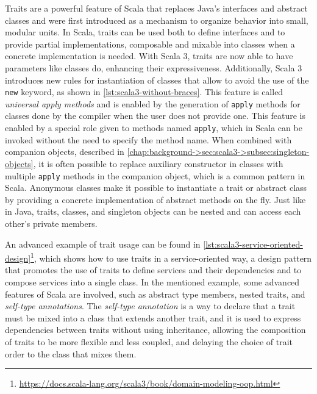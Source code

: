 Traits are a powerful feature of Scala that replaces Java's interfaces and abstract classes and were first introduced as a mechanism to organize behavior into small, modular units\cite{traits}.
%
In Scala, traits can be used both to define interfaces and to provide partial implementations, composable and mixable into classes when a concrete implementation is needed.
%
With Scala 3, traits are now able to have parameters like classes do, enhancing their expressiveness.
%
Additionally, Scala 3 introduces new rules for instantiation of classes that allow to avoid the use of the \texttt{new} keyword, as shown in \cref{lst:scala3-without-braces}.
%
This feature is called \textit{universal apply methods} and is enabled by the generation of \texttt{apply} methods for classes done by the compiler when the user does not provide one.
%
This feature is enabled by a special role given to methods named \texttt{apply}, which in Scala can be invoked without the need to specify the method name.
%
When combined with companion objects, described in \cref{chap:background->sec:scala3->subsec:singleton-objects}, it is often possible to replace auxiliary constructor in classes with multiple \texttt{apply} methods in the companion object, which is a common pattern in Scala.
%
Anonymous classes make it possible to instantiate a trait or abstract class by providing a concrete implementation of abstract methods on the fly.
%
Just like in Java, traits, classes, and singleton objects can be nested and can access each other's private members.

An advanced example of trait usage can be found in \cref{lst:scala3-service-oriented-design}\footnote{\url{https://docs.scala-lang.org/scala3/book/domain-modeling-oop.html}}, which shows how to use traits in a service-oriented way, a design pattern that promotes the use of traits to define services and their dependencies and to compose services into a single class\cite{service-oriented-design}.
%
In the mentioned example, some advanced features of Scala are involved, such as abstract type members, nested traits, and \textit{self-type annotations}.
%
The \textit{self-type annotation} is a way to declare that a trait must be mixed into a class that extends another trait, and it is used to express dependencies between traits without using inheritance, allowing the composition of traits to be more flexible and less coupled, and delaying the choice of trait order to the class that mixes them.




